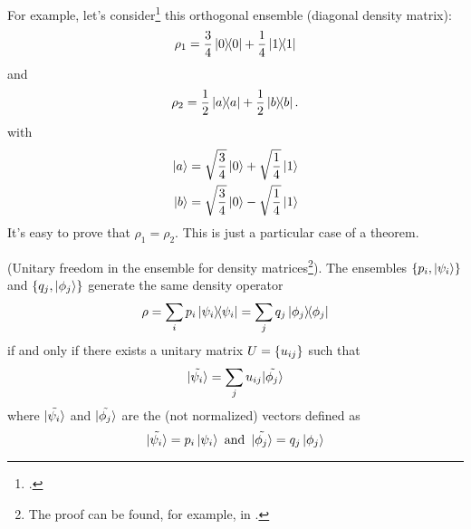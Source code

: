 For example, let's consider\footcite[\emph{Exercise 2.71: (Criterion to decide if a state is mixed or pure)}]{NielsenChuang}
this orthogonal ensemble (diagonal density matrix):
\[
  \rho_1 = \frac{3}{4}\ketbra{0}{0} + \frac{1}{4}\ketbra{1}{1}
\]
and
\[
  \rho_2 = \frac{1}{2}\ketbra{a}{a} + \frac{1}{2}\ketbra{b}{b}\text{.}
\]
with
\begin{align*}
  \ket{a} &= \sqrt{\frac{3}{4}}\ket{0} + \sqrt{\frac{1}{4}}\ket{1} \\
  \ket{b} &= \sqrt{\frac{3}{4}}\ket{0} - \sqrt{\frac{1}{4}}\ket{1}
\end{align*}
It's easy to prove that $\rho_1 = \rho_2$. This is just a particular
case of a theorem.
\begin{theorem}{(Unitary freedom in the ensemble for density matrices\footnote{
  \citereset The proof can be found, for example, in \cite[\emph{Theorem 2.6}]{NielsenChuang}.
}).}\label{th:density_u_free}
  The ensembles
  $\left\{p_i, \ket{\psi_i}\right\}$ and $\left\{q_{j}, \ket{\phi_j}\right\}$
  generate the same density operator
  $$\rho = \sum_i p_i \ketbra{\psi_i} = \sum_j q_j \ketbra{\phi_j}$$
  if and only if there exists
  a unitary matrix %
  $U = \left\{u_{ij}\right\}$ such that
  \[
    \tilde{\ket{\psi_i}} = \sum_j u_{ij}\tilde{\ket{\phi_j}}
  \]
  where $\tilde{\ket{\psi_i}}$ and $\tilde{\ket{\phi_j}}$
  are the (not normalized) vectors defined as
  \[
    \tilde{\ket{\psi_i}} = p_{i}\ket{\psi_i}
    \text{ and }\,
    \tilde{\ket{\phi_j}} = q_{j}\ket{\phi_j}
  \]
\end{theorem}
